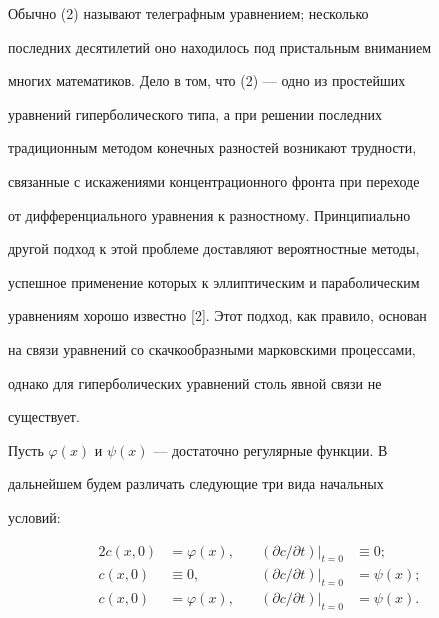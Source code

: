  


Обычно (2) называют телеграфным уравнением; несколько 


последних десятилетий оно находилось под пристальным вниманием 


многих математиков. Дело в том, что (2) --- одно из простейших 


уравнений гиперболического типа, а при решении последних 


традиционным методом конечных разностей возникают трудности, 


связанные с искажениями концентрационного фронта при переходе 


от дифференциального уравнения к разностному. Принципиально 


другой подход к этой проблеме доставляют вероятностные методы, 


успешное применение которых к эллиптическим и параболическим 


уравнениям хорошо известно [2]. Этот подход, как правило, основан 


на связи уравнений со скачкообразными марковскими процессами, 


однако для гиперболических уравнений столь явной связи не 


существует. 


 


Пусть $\varphi(x)$ и $\psi(x)$ --- достаточно регулярные функции. В 


дальнейшем будем различать следующие три вида начальных 


условий: 


\begin{alignat}{2} 


c(x,0)&=\varphi(x), &\quad (\partial c/\partial t) 


|_{t=0}&\equiv 0;\\ 


% 


c(x,0)&\equiv 0, &\quad (\partial c/\partial t) 


|_{t=0}&=\psi(x);\\ 


% 


c(x,0)&=\varphi(x), &\quad (\partial c/\partial t) 


|_{t=0}&=\psi(x). 


\end{alignat} 


 


